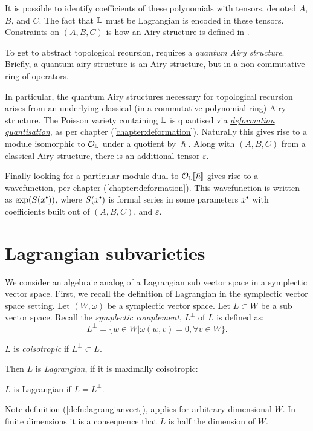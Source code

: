     It is possible to identify coefficients of these polynomials with tensors, denoted \(A\), \(B\), and \(C\). The fact that \( \mathbb{L}\) must be Lagrangian is encoded in these tensors. Constraints on \( (A,B,C)\) is how an Airy structure is defined in \cite{ks_airy}.
    
    To get to abstract topological recursion, requires a \emph{quantum Airy structure}. Briefly, a quantum airy structure is an Airy structure, but in a non-commutative ring of operators. 
    
    In particular, the quantum Airy structures necessary for topological recursion arises from an underlying classical (in a commutative polynomial ring) Airy structure. The Poisson variety containing \( \mathbb{L}\) is quantised via \emph{\hyperref[chapter:deformation]{deformation quantisation}}, as per chapter (\ref{chapter:deformation}). Naturally this gives rise to a module isomorphic to \(\mathcal{O}_{\mathbb{L}} \) under a quotient by \( \hslash\). Along with \((A,B,C)\) from a classical Airy structure, there is an additional tensor \( \varepsilon\).
    
    Finally looking for a particular module dual to \( \mathcal{O}_{\mathbb{L}} [\![ \hslash ]\!]\) gives rise to a wavefunction, per chapter (\ref{chapter:deformation}). This wavefunction is written as \( \exp(S(x^{\sbt}))\), where \(S(x^{\sbt})\) is formal series in some parameters \(x^{\sbt}\) with coefficients built out of \( (A,B,C)\),  and \( \varepsilon\).

    \section{Lagrangian subvarieties}
    
    We consider an algebraic analog of a Lagrangian sub vector space in a symplectic vector space. First, we recall the definition of Lagrangian in the symplectic vector space setting. Let \((W,\omega)\) be a symplectic vector space. Let \(L \subset W\) be a sub vector space. Recall the \emph{symplectic complement}, \(L^{\perp}\) of \(L\) is defined as: 
    \[ L^{\perp} = \{ w \in W | \omega(w,v) = 0 , \forall v \in W\}.\]
    \begin{defn}
    \label{defn:coisovect}
    \(L \) is \emph{coisotropic} if \( L^{\perp} \subset L\).
    \end{defn}
    Then \(L\) is \emph{Lagrangian}, if it is maximally coisotropic:
    \begin{defn}
    \label{defn:lagrangianvect}
    \(L \) is Lagrangian if \(L = L^{\perp}\).
    \end{defn}
    Note definition (\ref{defn:lagrangianvect}), applies for arbitrary dimensional \(W\). In finite dimensions it is a consequence that \(L\) is half the dimension of \(W\).    
    
